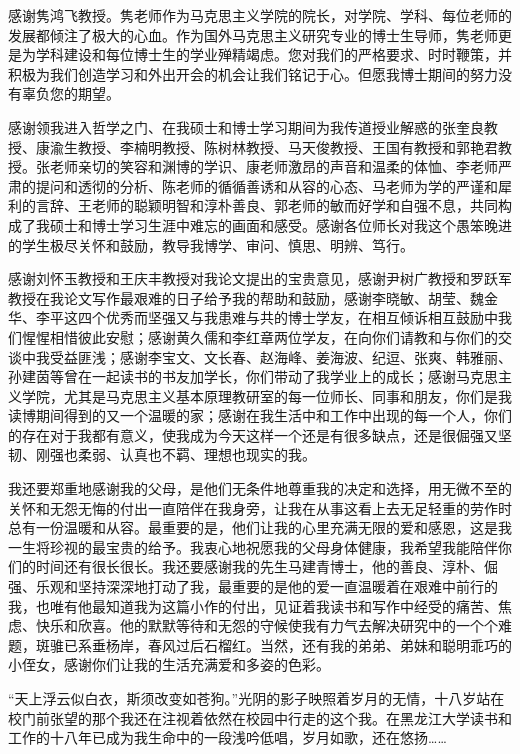\documentclass[UTF8, fontset = sourcesans, a4paper, oneside, zihao =
-4, scheme=chinese, no-math, space=true]{ctexbook}
\begin{document}
感谢隽鸿飞教授。隽老师作为马克思主义学院的院长，对学院、学科、每位老师的发展都倾注了极大的心血。作为国外马克思主义研究专业的博士生导师，隽老师更是为学科建设和每位博士生的学业殚精竭虑。您对我们的严格要求、时时鞭策，并积极为我们创造学习和外出开会的机会让我们铭记于心。但愿我博士期间的努力没有辜负您的期望。

感谢领我进入哲学之门、在我硕士和博士学习期间为我传道授业解惑的张奎良教授、康渝生教授、李楠明教授、陈树林教授、马天俊教授、王国有教授和郭艳君教授。张老师亲切的笑容和渊博的学识、康老师激昂的声音和温柔的体恤、李老师严肃的提问和透彻的分析、陈老师的循循善诱和从容的心态、马老师为学的严谨和犀利的言辞、王老师的聪颖明智和淳朴善良、郭老师的敏而好学和自强不息，共同构成了我硕士和博士学习生涯中难忘的画面和感受。感谢各位师长对我这个愚笨晚进的学生极尽关怀和鼓励，教导我博学、审问、慎思、明辨、笃行。

感谢刘怀玉教授和王庆丰教授对我论文提出的宝贵意见，感谢尹树广教授和罗跃军教授在我论文写作最艰难的日子给予我的帮助和鼓励，感谢李晓敏、胡莹、魏金华、李平这四个优秀而坚强又与我患难与共的博士学友，在相互倾诉相互鼓励中我们惺惺相惜彼此安慰；感谢黄久儒和李红章两位学友，在向你们请教和与你们的交谈中我受益匪浅；感谢李宝文、文长春、赵海峰、姜海波、纪逗、张爽、韩雅丽、孙建茵等曾在一起读书的书友加学长，你们带动了我学业上的成长；感谢马克思主义学院，尤其是马克思主义基本原理教研室的每一位师长、同事和朋友，你们是我读博期间得到的又一个温暖的家；感谢在我生活中和工作中出现的每一个人，你们的存在对于我都有意义，使我成为今天这样一个还是有很多缺点，还是很倔强又坚韧、刚强也柔弱、认真也不羁、理想也现实的我。

我还要郑重地感谢我的父母，是他们无条件地尊重我的决定和选择，用无微不至的关怀和无怨无悔的付出一直陪伴在我身旁，让我在从事这看上去无足轻重的劳作时总有一份温暖和从容。最重要的是，他们让我的心里充满无限的爱和感恩，这是我一生将珍视的最宝贵的给予。我衷心地祝愿我的父母身体健康，我希望我能陪伴你们的时间还有很长很长。我还要感谢我的先生马建青博士，他的善良、淳朴、倔强、乐观和坚持深深地打动了我，最重要的是他的爱一直温暖着在艰难中前行的我，也唯有他最知道我为这篇小作的付出，见证着我读书和写作中经受的痛苦、焦虑、快乐和欣喜。他的默默等待和无怨的守候使我有力气去解决研究中的一个个难题，斑骓已系垂杨岸，春风过后石榴红。当然，还有我的弟弟、弟妹和聪明乖巧的小侄女，感谢你们让我的生活充满爱和多姿的色彩。

``天上浮云似白衣，斯须改变如苍狗。''光阴的影子映照着岁月的无情，十八岁站在校门前张望的那个我还在注视着依然在校园中行走的这个我。在黑龙江大学读书和工作的十八年已成为我生命中的一段浅吟低唱，岁月如歌，还在悠扬……

\protect\hypertarget{part0014.html}{}{}
\end{document}
